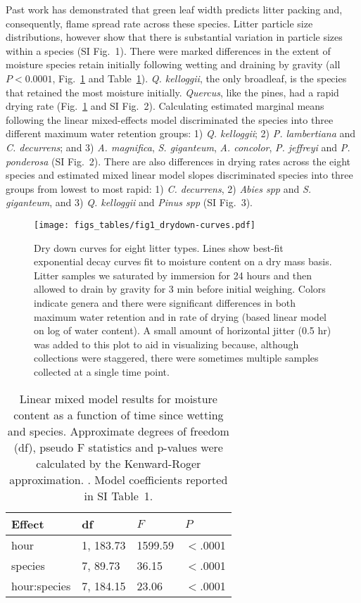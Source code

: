 \documentclass[letterpaper,12pt]{article}
\begin{document}
Past work has demonstrated that green leaf width predicts litter packing and,
consequently, flame spread rate across these species. Litter particle size
distributions, however show that there is substantial variation in particle
sizes within a species (SI Fig.~1). There were marked differences in the extent
of moisture species retain initially following wetting and draining by gravity
(all $P < 0.0001$, Fig.~\ref{fig:drydown} and Table~\ref{tab:drydown}).
\emph{Q. kelloggii}, the only broadleaf, is the species that retained the most
moisture initially. \emph{Quercus}, like the pines, had a rapid drying rate
(Fig.~\ref{fig:drydown} and SI Fig.~2). Calculating estimated marginal means
following the linear mixed-effects model discriminated the species into three
different maximum water retention groups: 1) \emph{Q. kelloggii}; 2) \emph{P.
  lambertiana} and \emph{C. decurrens}; and 3) \emph{A. magnifica}, \emph{S.
  giganteum}, \emph{A. concolor}, \emph{P. jeffreyi} and \emph{P. ponderosa}
(SI Fig.~2). There are also differences in drying rates across the eight
species and estimated mixed linear model slopes discriminated species into
three groups from lowest to most rapid: 1) \emph{C. decurrens}, 2) \emph{Abies
  spp} and \emph{S. giganteum}, and 3) \emph{Q. kelloggii} and \emph{Pinus spp}
(SI Fig.~3).

\begin{figure}[h]
  \centering
\texttt{[image: figs\_tables/fig1\_drydown-curves.pdf]}
\caption{Dry down curves for eight litter types. Lines show best-fit
  exponential decay curves fit to moisture content on a dry mass basis. Litter
  samples we saturated by immersion for 24 hours and then allowed to drain by
  gravity for 3 min before initial weighing. Colors indicate genera and there
  were significant differences in both maximum water retention and in rate of
  drying (based linear model on log of water content). A small amount of
  horizontal jitter (0.5 hr) was added to this plot to aid in visualizing
  because, although collections were staggered, there were sometimes multiple
  samples collected at a single time point.}
 \label{fig:drydown}
\end{figure}


\begin{table}[h]
  \caption{Linear mixed model results for moisture content as a function of
    time since wetting and species. Approximate degrees of freedom (df), pseudo F
    statistics and p-values were calculated by the Kenward-Roger approximation.
    \citep{Kenward_Roger-1997}. Model coefficients reported in SI Table~1.}
  \label{tab:drydown}
\centering
\begin{tabular}{llll}
  \toprule
Effect & df & $F$ & $P$ \\ 
  \midrule
  hour & 1, 183.73 & 1599.59 & $<$.0001 \\ 
  species & 7, 89.73 & 36.15 & $<$.0001 \\ 
  hour:species & 7, 184.15 & 23.06 & $<$.0001 \\ 
   \bottomrule
\end{tabular}
\end{table}
\end{document}
